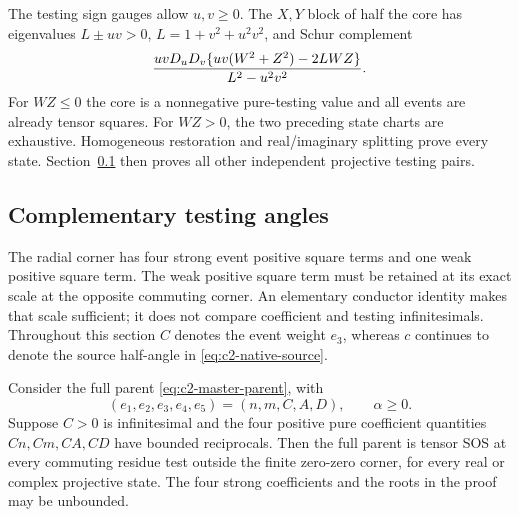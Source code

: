 The testing sign gauges allow $u,v\ge0$. The $X,Y$ block of half
the core has eigenvalues $L\pm uv>0$, $L=1+v^2+u^2v^2$, and Schur
complement
\[
 {uvD_uD_v\{uv(W^2+Z^2)-2LWZ\}\over L^2-u^2v^2}.
\]
For $WZ\le0$ the core is a nonnegative pure-testing value and all
events are already tensor squares. For $WZ>0$, the two preceding
state charts are exhaustive. Homogeneous restoration and real/imaginary
splitting prove every state. Section~\ref{component:pc7dacaa3258e}
then proves all other independent projective testing pairs.

\subsection{Complementary testing angles}
\label{component:pc7dacaa3258e}

\label{pc7dacaa3258e:sec:c2-radial-all-tests}

The radial corner has four strong event positive square terms and one weak positive square term.
The weak positive square term must be retained at its exact scale at the opposite
commuting corner.  An elementary conductor identity makes that scale
sufficient; it does not compare coefficient and testing infinitesimals.
Throughout this section $C$ denotes the event weight $e_3$, whereas $c$
continues to denote the source half-angle in \eqref{eq:c2-native-source}.

\begin{lemma}
\label{pc7dacaa3258e:lem:c2-four-strong-outer}
Consider the full parent \eqref{eq:c2-master-parent}, with
\[
 (e_1,e_2,e_3,e_4,e_5)=(n,m,C,A,D),\qquad \alpha\geq0.
\]
Suppose $C>0$ is infinitesimal and the four positive pure coefficient
quantities $Cn,Cm,CA,CD$ have bounded reciprocals.  Then the full parent
is tensor SOS at every commuting residue test outside the finite
zero-zero corner, for every real or complex projective state.
The four strong coefficients and the roots in the proof may be unbounded.
\end{lemma}

